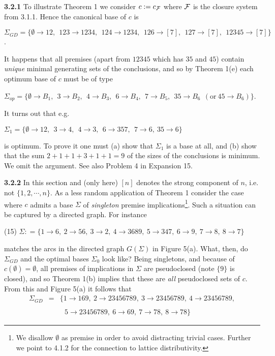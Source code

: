 \documentclass[11pt]{article}
\newcommand{\ra}{\rightarrow}
\begin{document}
{\bf 3.2.1} To illustrate Theorem 1 we consider $c: = c_{\cal F}$ where ${\cal F}$ is the closure system from 3.1.1. Hence the canonical base of $c$ is


$\Sigma_{GD} = \{\emptyset \ra 12, \ \ 123 \ra 1234, \ \ 124 \ra 1234, \ \ 126 \ra [7], \ \ 127 \ra [7], \ \ 12345 \ra [7]\}$.

It happens that all premises (apart from $12345$ which has $35$ and $45$) contain {\it unique} minimal generating sets of the conclusions, and so by Theorem 1(e) each optimum base of $c$ must be of type

$\Sigma_{op} = \{\emptyset \ra B_1, \ \ 3 \ra B_2, \ \ 4 \ra B_3, \ \ 6 \ra B_4, \ \ 7 \ra B_5, \ \ 35 \ra B_6  \ \ (\mbox{or} \ 45 \ra B_6)\}$.

It turns out that e.g.

$\Sigma_1 = \{\emptyset \ra 12,\ \ 3 \ra 4,  \ \ 4 \ra 3, \ \ 6 \ra 357, \ \ 7 \ra 6, \ 35 \ra 6\}$

is optimum. To prove it one must (a) show that $\Sigma_1$ is a base at all, and (b) show that the sum $2+1+1+3+1+1=9$ of the sizes of the conclusions is minimum. We omit the argument. See also Problem 4 in Expansion 15.


{\bf 3.2.2} In this section and (only here) $[n]$ denotes the strong component of $n$, i.e. not $\{1, 2, \cdots, n\}$. As a less random application of Theorem 1 consider the case where $c$ admits a base $\Sigma$ of {\it singleton} premise implications\footnote{We disallow $\emptyset$ as premise in order to avoid distracting trivial cases. Further we point to 4.1.2 for the connection to lattice distributivity.}.  Such a situation can be captured by a directed graph. For instance

(15) \quad $\Sigma : = \{ 1 \ra 6, \ 2 \ra 56, \ 3 \ra 2, \ 4 \ra 3689, \ 5 \ra 347, \ 6 \ra 9, \ 7 \ra 8, \ 8 \ra 7 \}$

matches the arcs in the directed graph $G(\Sigma)$ in Figure 5(a). What, then, do $\Sigma_{GD}$ and the optimal bases $\Sigma_0$ look like? Being singletons, and because of $c(\emptyset)  =\emptyset$, all premises of implications in $\Sigma$ are pseudoclosed (note $\{9\}$ is closed), and so Theorem 1(b) implies that these are {\it all} pseudoclosed sets of $c$. From this and Figure 5(a) it follows that
$$\begin{array}{lll} \Sigma_{GD} & = & \{1 \ra 169,  \ 2 \ra 23456789, \ 3 \ra 23456789, \ 4 \ra 23456789, \\
\\
& & \ \ \ 5 \ra 23456789, \ 6 \ra 69, \ 7 \ra 78, \ 8 \ra 78 \} \end{array}$$
\end{document}
